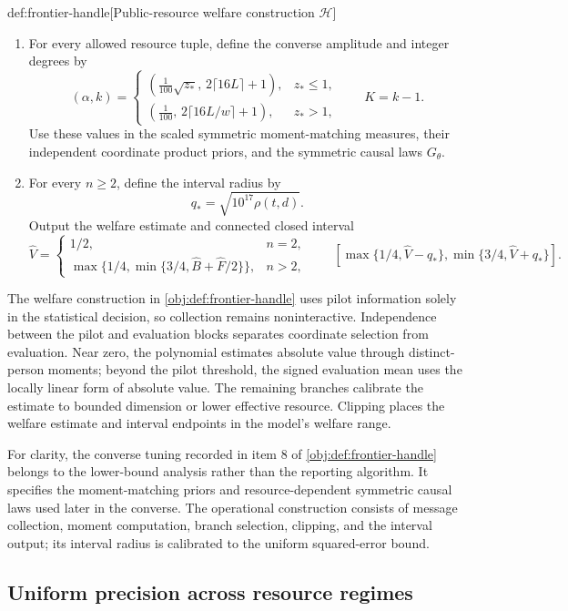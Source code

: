 \documentclass[11pt]{article}
\begin{document}
\begin{algorithmv}{def:frontier-handle}[Public-resource welfare construction $\mathscr H$]
\begin{enumerate}
\item For every allowed resource tuple, define the converse amplitude and integer degrees by
\[
(\alpha,k)=
\begin{cases}
\left(\displaystyle\frac1{100}\sqrt{z_*},
\,2\lceil16L\rceil+1\right),&z_*\le1,\\[3pt]
\left(\displaystyle\frac1{100},
\,2\lceil16L/w\rceil+1\right),&z_*>1,
\end{cases}
\qquad K=k-1.
\]
Use these values in the scaled symmetric moment-matching measures, their independent coordinate product priors, and the symmetric causal laws \(G_\theta\).

\item For every \(n\ge2\), define the interval radius by
\[
q_*=\sqrt{10^{17}\rho(t,d)}.
\]
Output the welfare estimate and connected closed interval
\[
\widehat V=
\begin{cases}
1/2,&n=2,\\
\max\{1/4,\min\{3/4,\widehat B+\widehat F/2\}\},&n>2,
\end{cases}
\qquad
\left[
\max\{1/4,\widehat V-q_*\},
\min\{3/4,\widehat V+q_*\}
\right].
\]
\end{enumerate}
\end{algorithmv}

The welfare construction  in \cref{obj:def:frontier-handle} uses pilot information solely in the statistical decision, so collection remains noninteractive. Independence between the pilot and evaluation blocks separates coordinate selection from evaluation. Near zero, the polynomial estimates absolute value through distinct-person moments; beyond the pilot threshold, the signed evaluation mean uses the locally linear form of absolute value. The remaining branches calibrate the estimate to bounded dimension or lower effective resource. Clipping places the welfare estimate and interval endpoints in the model's welfare range.

For clarity, the converse tuning recorded in item 8 of \cref{obj:def:frontier-handle} belongs to the lower-bound analysis rather than the reporting algorithm. It specifies the moment-matching priors and resource-dependent symmetric causal laws used later in the converse. The operational construction consists of message collection, moment computation, branch selection, clipping, and the interval output; its interval radius is calibrated to the uniform squared-error bound.

\subsection{Uniform precision across resource regimes}
\end{document}
